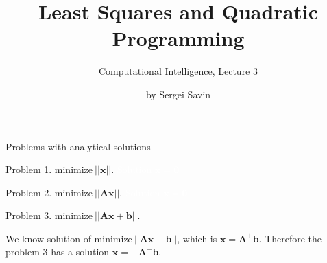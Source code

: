 \documentclass{beamer}
\title{Least Squares and Quadratic Programming}
\subtitle{Computational Intelligence, Lecture 3}
\author{by Sergei Savin}
\date{\mydate}
\begin{document}
\maketitle


%
%



\begin{frame}{Problems with analytical solutions}
\begin{flushleft}

Problem 1. $\text{minimize} \ ||\mathbf{x}||$. \textcolor{white}{Solution $\mathbf{x} = \mathbf{0}$} 

\bigskip

Problem 2. $\text{minimize} \ ||\mathbf{A}\mathbf{x}||$. \textcolor{white}{Solution $\mathbf{x} = \mathbf{0}$.}

\bigskip

Problem 3. $\text{minimize} \ ||\mathbf{A}\mathbf{x} + \mathbf{b}||$. 

\bigskip

We know solution of $\text{minimize} \ ||\mathbf{A}\mathbf{x} - \mathbf{b}||$, which is $\mathbf{x} = \mathbf{A}^+ \mathbf{b}$. Therefore the problem 3 has a solution $\mathbf{x} = -\mathbf{A}^+ \mathbf{b}$.
 
\end{flushleft}
\end{frame}
\end{document}
